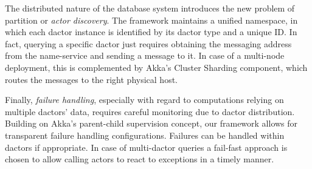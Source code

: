       The distributed nature of the database system introduces the new problem of partition or \emph{actor discovery}.
      The framework maintains a unified namespace, in which each \gls{dactor} instance is identified by its \gls{dactor} type and a unique ID.
      In fact, querying a specific \gls{dactor} just requires obtaining the messaging address from the name-service and sending a message to it.
      In case of a multi-node deployment, this is complemented by Akka's Cluster Sharding component, which routes the messages to the right physical host.
      
      Finally, \emph{failure handling}, especially with regard to computations relying on multiple \glspl{dactor}' data, requires careful monitoring due to \gls{dactor} distribution.
      Building on Akka's parent-child supervision concept, our framework allows for transparent failure handling configurations.
      Failures can be handled within \glspl{dactor} if appropriate.
      In case of multi-\gls{dactor} queries a fail-fast approach is chosen to allow calling actors to react to exceptions in a timely manner.